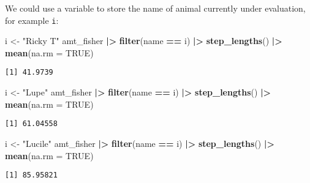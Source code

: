 \documentclass[ignorenonframetext,,t]{beamer}
\let\oldtextbf\textbf
\renewcommand{\textbf}[1]{\textcolor{spamwell}{\oldtextbf{#1}}}
\newenvironment{Shaded}{\begin{snugshade}}{\end{snugshade}}
\newcommand{\AttributeTok}[1]{\textcolor[rgb]{0.13,0.29,0.53}{#1}}
\newcommand{\ConstantTok}[1]{\textcolor[rgb]{0.56,0.35,0.01}{#1}}
\newcommand{\FunctionTok}[1]{\textcolor[rgb]{0.13,0.29,0.53}{\textbf{#1}}}
\newcommand{\NormalTok}[1]{#1}
\newcommand{\OtherTok}[1]{\textcolor[rgb]{0.56,0.35,0.01}{#1}}
\newcommand{\SpecialCharTok}[1]{\textcolor[rgb]{0.81,0.36,0.00}{\textbf{#1}}}
\newcommand{\StringTok}[1]{\textcolor[rgb]{0.31,0.60,0.02}{#1}}
\begin{document}
\begin{frame}[fragile]
We could use a variable to store the name of animal currently under
evaluation, for example \texttt{i}:

\begin{Shaded}
\begin{Highlighting}[]
\NormalTok{i }\OtherTok{\textless{}{-}} \StringTok{"Ricky T"}
\NormalTok{amt\_fisher }\SpecialCharTok{|\textgreater{}} \FunctionTok{filter}\NormalTok{(name }\SpecialCharTok{==}\NormalTok{ i) }\SpecialCharTok{|\textgreater{}} 
  \FunctionTok{step\_lengths}\NormalTok{() }\SpecialCharTok{|\textgreater{}} \FunctionTok{mean}\NormalTok{(}\AttributeTok{na.rm =} \ConstantTok{TRUE}\NormalTok{)}
\end{Highlighting}
\end{Shaded}

\begin{verbatim}
[1] 41.9739
\end{verbatim}

\begin{Shaded}
\begin{Highlighting}[]
\NormalTok{i }\OtherTok{\textless{}{-}} \StringTok{"Lupe"}
\NormalTok{amt\_fisher }\SpecialCharTok{|\textgreater{}} \FunctionTok{filter}\NormalTok{(name }\SpecialCharTok{==}\NormalTok{ i) }\SpecialCharTok{|\textgreater{}} 
  \FunctionTok{step\_lengths}\NormalTok{() }\SpecialCharTok{|\textgreater{}} \FunctionTok{mean}\NormalTok{(}\AttributeTok{na.rm =} \ConstantTok{TRUE}\NormalTok{)}
\end{Highlighting}
\end{Shaded}

\begin{verbatim}
[1] 61.04558
\end{verbatim}

\begin{Shaded}
\begin{Highlighting}[]
\NormalTok{i }\OtherTok{\textless{}{-}} \StringTok{"Lucile"}
\NormalTok{amt\_fisher }\SpecialCharTok{|\textgreater{}} \FunctionTok{filter}\NormalTok{(name }\SpecialCharTok{==}\NormalTok{ i) }\SpecialCharTok{|\textgreater{}} 
  \FunctionTok{step\_lengths}\NormalTok{() }\SpecialCharTok{|\textgreater{}} \FunctionTok{mean}\NormalTok{(}\AttributeTok{na.rm =} \ConstantTok{TRUE}\NormalTok{)}
\end{Highlighting}
\end{Shaded}

\begin{verbatim}
[1] 85.95821
\end{verbatim}
\end{frame}
\end{document}
